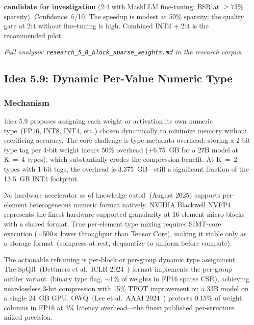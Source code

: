 \documentclass[11pt]{article}
\begin{document}
\noindent\textbf{candidate for investigation} (2:4 with MaskLLM fine-tuning; BSR at $\geq$75\% sparsity). Confidence: 6/10. The speedup is modest at 50\% sparsity; the quality gate at 2:4 without fine-tuning is high. Combined INT4 + 2:4 is the recommended pilot.

\par\noindent\textit{Full analysis: \texttt{research\_5\_8\_block\_sparse\_weights.md} in the research corpus.}


\subsection{Idea 5.9: Dynamic Per-Value Numeric Type}
\label{subsec:idea59}

\subsubsection*{Mechanism}

Idea 5.9 proposes assigning each weight or activation its own numeric type~(FP16, INT8, INT4, etc.) chosen dynamically to minimize memory without sacrificing accuracy. The core challenge is type metadata overhead: storing a 2-bit type tag per 4-bit weight incurs 50\% overhead ($+$6.75~GB for a 27B model at K~=~4 types), which substantially erodes the compression benefit. At K~=~2 types with 1-bit tags, the overhead is 3.375~GB---still a significant fraction of the 13.5~GB INT4 footprint.

No hardware accelerator as of knowledge cutoff~(August 2025) supports per-element heterogeneous numeric format natively. NVIDIA Blackwell NVFP4 represents the finest hardware-supported granularity at 16-element micro-blocks with a shared format. True per-element type mixing requires SIMT-core execution ($\sim$500$\times$ lower throughput than Tensor Core), making it viable only as a storage format~(compress at rest, dequantize to uniform before compute).

The actionable reframing is per-block or per-group dynamic type assignment. The SpQR~(Dettmers et al.\ ICLR 2024~\cite{DettmersSpQR2024}) format implements the per-group outlier variant~(binary type flag, $\sim$1\% of weights in FP16 sparse CSR), achieving near-lossless 3-bit compression with 15\% TPOT improvement on a 33B model on a single 24~GB GPU. OWQ~(Lee et al.\ AAAI 2024~\cite{LeeOWQ2024}) protects 0.15\% of weight columns in FP16 at 3\% latency overhead---the finest published per-structure mixed precision.
\end{document}
